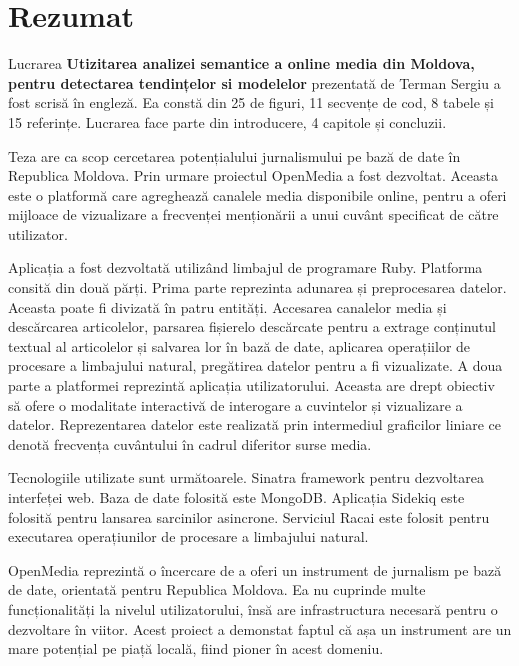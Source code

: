 \section*{Rezumat}
Lucrarea \textbf{Utizitarea analizei semantice a online media din Moldova, pentru detectarea tendințelor si modelelor} prezentată de Terman Sergiu a fost scrisă în engleză. Ea constă din 25 de figuri, 11 secvențe de cod, 8 tabele și 15 referințe. Lucrarea face parte din introducere, 4 capitole și concluzii.

Teza are ca scop cercetarea potențialului jurnalismului pe bază de date în Republica Moldova. Prin urmare proiectul OpenMedia a fost dezvoltat. Aceasta este o platformă care agreghează canalele media disponibile online, pentru a oferi mijloace de vizualizare a frecvenței menționării a unui cuvânt specificat de către utilizator.

Aplicația a fost dezvoltată utilizând limbajul de programare Ruby. Platforma consită din două părți. Prima parte reprezinta adunarea și preprocesarea datelor. Aceasta poate fi divizată în patru entități. Accesarea canalelor media și descărcarea articolelor, parsarea fișierelo descărcate pentru a extrage conținutul textual al articolelor și salvarea lor în bază de date, aplicarea operațiilor de procesare a limbajului natural, pregătirea datelor pentru a fi vizualizate. A doua parte a platformei reprezintă aplicația utilizatorului. Aceasta are drept obiectiv să ofere o modalitate interactivă de interogare a cuvintelor și vizualizare a datelor. Reprezentarea datelor este realizată prin intermediul graficilor liniare ce denotă frecvența cuvântului în cadrul diferitor surse media.

Tecnologiile utilizate sunt următoarele. Sinatra framework pentru dezvoltarea interfeței web. Baza de date folosită este MongoDB. Aplicația Sidekiq este folosită pentru lansarea sarcinilor \mbox{asincrone}. Serviciul Racai este folosit pentru executarea operațiunilor de procesare a limbajului \mbox{natural}.


OpenMedia reprezintă o încercare de a oferi un instrument de jurnalism pe bază de date, orientată pentru Republica Moldova. Ea nu cuprinde multe funcționalități la nivelul utilizatorului, însă are infrastructura necesară pentru o dezvoltare în viitor. Acest proiect a demonstat faptul că așa un instrument are un mare potențial pe piață locală, fiind pioner în acest domeniu.
